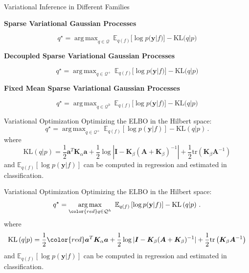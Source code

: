 \documentclass[aspectratio=149]{beamer}
\DeclareMathOperator*{\argmax}{arg\,max}
\begin{document}
    \begin{frame}{Variational Inference in Different Families}
        \begin{center}
            \textbf{Sparse Variational Gaussian Processes}
        \end{center}
        \[
        q^\star = \argmax_{q \in \mathcal{Q}}\  \mathbb{E}_{q(f)}[ \log p(\mathbf{y} | f)] - \text{KL}\big(q|p\big)
        \]   
        \pause
        \begin{center}
            \textbf{Decoupled Sparse Variational Gaussian Processes}
        \end{center}
        \[
        q^\star = \argmax_{q \in \mathcal{Q}^+}\ \mathbb{E}_{q(f)}[ \log p(\mathbf{y} | f)] - \text{KL}\big(q|p\big)
        \]   
        \pause
        \begin{center}
            \textbf{Fixed Mean Sparse Variational Gaussian Processes}
        \end{center}
        \[
        q^\star = \argmax_{q \in \mathcal{Q}^h}\  \mathbb{E}_{q(f)}[ \log p(\mathbf{y} | f)] - \text{KL}\big(q|p\big)
        \]   
    \end{frame}

    \begin{frame}{Variational Optimization}
        Optimizing the ELBO in the Hilbert space:
        \[
        q^\star = \argmax_{q \in \mathcal{Q}^+}\ \mathbb{E}_{q(f)} \left[ \log p(\mathbf{y}|f)\right] - \text{KL}\left(q|p\right)\,.
        \]
        where
        \[
            \text{KL}\left(q | p\right) = \frac{1}{2} \bm{a}^T \bm{K}_{\alpha} \bm{a} + \frac{1}{2} \log |\bm{I} - \bm{K}_{\beta} (\bm{A} + \bm{K}_{\beta})^{-1}| + \frac{1}{2} \text{tr}\left( \bm{K}_\beta\bm{A}^{-1} \right)
        \]
        and \(\mathbb{E}_{q(f)}\left[ \log p(\mathbf{y}|f)\right] \) can be computed in regression and estimated in classification.
    \end{frame}

    \begin{frame}{Variational Optimization}
        Optimizing the ELBO in the Hilbert space:
        \[
        q^\star = \argmax_{\color{red}q \in \mathcal{Q}^h}\ \mathbb{E}_{q(f)} \left[ \log p(\mathbf{y}|f)\right] - \text{KL}\left(q| p\right)\,.
        \]
        where
        \[
            \begin{aligned}
                \text{KL}\left(q | p\right) = \frac{1}{2} {\color{red}\bm{a}^T \bm{K}_{\alpha} \bm{a}} + \frac{1}{2} \log |\bm{I} - \bm{K}_{\beta} (\bm{A} + \bm{K}_{\beta})^{-1}| + \frac{1}{2} \text{tr}\left( \bm{K}_\beta\bm{A}^{-1} \right)
            \end{aligned}
        \]
        and \(\mathbb{E}_{q(f)}\left[ \log p(\mathbf{y}|f)\right] \) can be computed in regression and estimated in classification.
    \end{frame}
\end{document}
